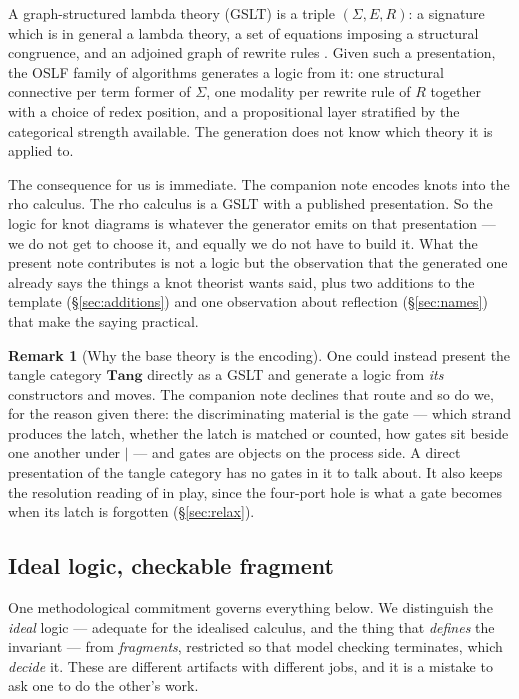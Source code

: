 \documentclass[11pt]{article}
\theoremstyle{definition}
\newtheorem{remark}{Remark}
\newcommand{\sep}{\mathbin{\vert}}
\begin{document}
A graph-structured lambda theory (GSLT) is a triple $(\Sigma, E, R)$: a signature
which is in general a lambda theory, a set of equations imposing a structural
congruence, and an adjoined graph of rewrite rules \cite{omnibus}. Given such a
presentation, the OSLF family of algorithms generates a logic from it: one
structural connective per term former of $\Sigma$, one modality per rewrite rule
of $R$ together with a choice of redex position, and a propositional layer
stratified by the categorical strength available. The generation does not know
which theory it is applied to.

The consequence for us is immediate. The companion note encodes knots into the
rho calculus. The rho calculus is a GSLT with a published presentation. So the
logic for knot diagrams is whatever the generator emits on that presentation ---
we do not get to choose it, and equally we do not have to build it. What the
present note contributes is not a logic but the observation that the generated
one already says the things a knot theorist wants said, plus two additions to the
template (\S\ref{sec:additions}) and one observation about reflection
(\S\ref{sec:names}) that make the saying practical.

\begin{remark}[Why the base theory is the encoding]
One could instead present the tangle category $\mathbf{Tang}$ directly as a GSLT
and generate a logic from \emph{its} constructors and moves. The companion note
declines that route and so do we, for the reason given there: the discriminating
material is the gate --- which strand produces the latch, whether the latch is
matched or counted, how gates sit beside one another under $\sep$ --- and gates
are objects on the process side. A direct presentation of the tangle category has
no gates in it to talk about. It also keeps the resolution reading of
\cite[\S9]{knots} in play, since the four-port hole is what a gate becomes when
its latch is forgotten (\S\ref{sec:relax}).
\end{remark}

\subsection{Ideal logic, checkable fragment}\label{sec:ideal}

One methodological commitment governs everything below. We distinguish the
\emph{ideal} logic --- adequate for the idealised calculus, and the thing that
\emph{defines} the invariant --- from \emph{fragments}, restricted so that model
checking terminates, which \emph{decide} it. These are different artifacts with
different jobs, and it is a mistake to ask one to do the other's work.
\end{document}
